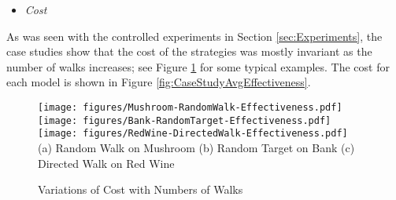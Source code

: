 \documentclass[preprint,1p,authoryear,times]{elsarticle}
\begin{document}
\begin{itemize}
\item \emph{Cost}
\end{itemize}

As was seen with the controlled experiments in Section \ref{sec:Experiments}, the case studies show that the cost of the strategies was mostly invariant as the number of walks increases; see Figure \ref{fig:CaseStudyEffectiveness} for some typical examples. The cost for each model is shown in Figure \ref{fig:CaseStudyAvgEffectiveness}. 

\begin{figure}[h]
	\centering
	\texttt{[image: figures/Mushroom-RandomWalk-Effectiveness.pdf]}
	\texttt{[image: figures/Bank-RandomTarget-Effectiveness.pdf]}
	\texttt{[image: figures/RedWine-DirectedWalk-Effectiveness.pdf]}\\
	\scriptsize{(a) Random Walk on Mushroom \hspace{1cm} (b) Random Target on Bank \hspace{1cm} (c) Directed Walk on Red Wine}
	\caption{Variations of Cost with Numbers of Walks}
	\label{fig:CaseStudyEffectiveness}
\end{figure}
\end{document}
